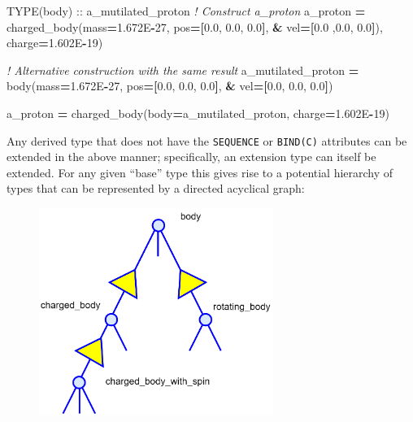 \documentclass[
  paper=a4,
  ,captions=tableheading
]{scrartcl}
\newenvironment{Shaded}{\begin{snugshade}}{\end{snugshade}}
\newcommand{\CommentTok}[1]{\textcolor[rgb]{0.56,0.35,0.01}{\textit{#1}}}
\newcommand{\DataTypeTok}[1]{\textcolor[rgb]{0.13,0.29,0.53}{#1}}
\newcommand{\DecValTok}[1]{\textcolor[rgb]{0.00,0.00,0.81}{#1}}
\newcommand{\FloatTok}[1]{\textcolor[rgb]{0.00,0.00,0.81}{#1}}
\newcommand{\KeywordTok}[1]{\textcolor[rgb]{0.13,0.29,0.53}{\textbf{#1}}}
\newcommand{\NormalTok}[1]{#1}
\begin{document}
\begin{Shaded}
\begin{Highlighting}[]
\DataTypeTok{TYPE(body)} \DataTypeTok{::}\NormalTok{ a\_mutilated\_proton}
\CommentTok{! Construct a\_proton}
\NormalTok{a\_proton }\KeywordTok{=}\NormalTok{ charged\_body(mass}\KeywordTok{=}\FloatTok{1.672}\NormalTok{E}\KeywordTok{{-}}\DecValTok{27}\NormalTok{, pos}\KeywordTok{=[}\FloatTok{0.0}\NormalTok{, }\FloatTok{0.0}\NormalTok{, }\FloatTok{0.0}\KeywordTok{]}\NormalTok{, }\KeywordTok{\&}
\NormalTok{                        vel}\KeywordTok{=[}\FloatTok{0.0}\NormalTok{ ,}\FloatTok{0.0}\NormalTok{, }\FloatTok{0.0}\KeywordTok{]}\NormalTok{), charge}\KeywordTok{=}\FloatTok{1.602}\NormalTok{E}\KeywordTok{{-}}\DecValTok{19}\NormalTok{)}

\CommentTok{! Alternative construction with the same result}
\NormalTok{a\_mutilated\_proton }\KeywordTok{=}\NormalTok{ body(mass}\KeywordTok{=}\FloatTok{1.672}\NormalTok{E}\KeywordTok{{-}}\DecValTok{27}\NormalTok{, pos}\KeywordTok{=[}\FloatTok{0.0}\NormalTok{, }\FloatTok{0.0}\NormalTok{, }\FloatTok{0.0}\KeywordTok{]}\NormalTok{, }\KeywordTok{\&}
\NormalTok{                          vel}\KeywordTok{=[}\FloatTok{0.0}\NormalTok{, }\FloatTok{0.0}\NormalTok{, }\FloatTok{0.0}\KeywordTok{]}\NormalTok{)}

\NormalTok{a\_proton }\KeywordTok{=}\NormalTok{ charged\_body(body}\KeywordTok{=}\NormalTok{a\_mutilated\_proton, charge}\KeywordTok{=}\FloatTok{1.602}\NormalTok{E}\KeywordTok{{-}}\DecValTok{19}\NormalTok{)}
\end{Highlighting}
\end{Shaded}

Any derived type that does not have the \texttt{SEQUENCE} or
\texttt{BIND(C)} attributes can be extended in the above manner;
specifically, an extension type can itself be extended. For any given
``base'' type this gives rise to a potential hierarchy of types that can
be represented by a directed acyclical graph:

\begin{figure}
\centering
\includegraphics[width=3in,height=\textheight,keepaspectratio]{./images/Inheritance_diagram.png}
\caption{~}
\end{figure}
\end{document}
